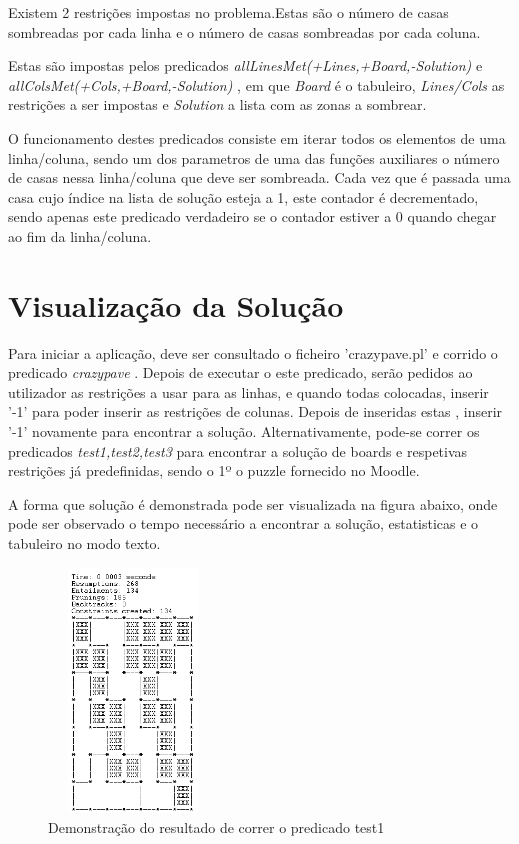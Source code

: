 \documentclass[runningheads,a4paper]{llncs}
\begin{document}
Existem 2 restrições impostas no problema.Estas são o número de casas sombreadas por cada linha e o número de casas sombreadas por cada coluna.

Estas são impostas pelos predicados \textit{allLinesMet(+Lines,+Board,-Solution)} e \textit{allColsMet(+Cols,+Board,-Solution)} , em que \textit{Board} é o tabuleiro, \textit{Lines/Cols} as restrições a ser impostas e \textit{Solution} a lista com as zonas a sombrear.

O funcionamento destes predicados consiste em iterar todos os elementos de uma linha/coluna, sendo um dos parametros de uma das funções auxiliares o número de casas nessa linha/coluna que deve ser sombreada.
Cada vez que é passada uma casa cujo índice na lista de solução esteja a 1, este contador é decrementado, sendo apenas este predicado verdadeiro se o contador estiver a 0 quando chegar ao fim da linha/coluna.


\section{Visualização da Solução}

Para iniciar a aplicação, deve ser consultado o ficheiro 'crazypave.pl' e corrido o predicado \textit{crazypave} .
Depois de executar o este predicado, serão pedidos ao utilizador as restrições a usar para as linhas, e quando todas colocadas, inserir '-1' para poder inserir as restrições de colunas.
Depois de inseridas estas , inserir '-1' novamente para encontrar a solução.
Alternativamente, pode-se correr os predicados \textit{test1,test2,test3} para encontrar a solução de boards e respetivas restrições já predefinidas, sendo o 1º o puzzle fornecido no Moodle.

A forma que solução é demonstrada pode ser visualizada na figura abaixo, onde pode ser observado o tempo necessário a encontrar a solução, estatisticas e o tabuleiro no modo texto.



\begin{figure}
\centering
\includegraphics[height=6.5cm,width=4.5cm]{exemplo4.png}
\caption{Demonstração do resultado de correr o predicado test1} 
\label{fig:crazypavementexandsol}
\end{figure}
\end{document}
